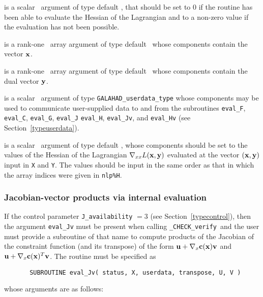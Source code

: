 \documentclass{galahad}
\newcommand{\packagename}{CHECK}
\newcommand{\fullpackagename}{\libraryname\_\packagename}
\newcommand{\solver}{{\tt \fullpackagename\_verify}}
\begin{document}
\begin{description}

 is a scalar \intentout\ argument of type default \integer,
that should be set to 0 if the routine has been able to evaluate
the Hessian of the Lagrangian 
and to a non-zero value if the evaluation has not been possible.

 is a rank-one \intentin\ array argument of type default \realdp\
whose components contain the vector ${\mathbf{x}}$.

 is a rank-one \intentin\ array argument of type default \realdp\
whose components contain the dual vector ${\mathbf{y}}$.

 is a scalar \intentinout\ argument of type 
{\tt GALAHAD\_userdata\_type} whose components may be used
to communicate user-supplied data to and from the
subroutines {\tt eval\_F}, {\tt eval\_C}, {\tt eval\_G}, {\tt eval\_J}
{\tt eval\_H}, {\tt eval\_Jv}, and {\tt eval\_Hv} 
(see Section~\ref{typeuserdata}). 

 is a scalar \intentout\ argument of type default \realdp,
whose components should be set to the values of the Hessian
of the Lagrangian $\nabla_{xx} L({\mathbf{x}},{\mathbf{y}})$
evaluated at the vector $({\mathbf{x}},{\mathbf{y}})$ input in {\tt X} and {\tt Y}. The values should
be input in the same order as that in which the array indices were
given in {\tt nlp\%H}.

\end{description}


\subsubsection{Jacobian-vector products via internal evaluation\label{jvfv}}

If the control parameter {\tt J\_availability} $=3$ (see
Section~\ref{typecontrol}), then the argument {\tt eval\_Jv} must be
present when calling \solver\ and the
user must provide a subroutine of that name to compute
products of the Jacobian of the constraint function (and its transpose)
of the form ${\mathbf{u}} + \nabla_{x} {\mathbf{c}}({\mathbf{x}}){\mathbf{v}}$ and
${\mathbf{u}} + \nabla_{x} {\mathbf{c}}({\mathbf{x}})^T{\mathbf{v}}$.
The routine must be specified as

\def\baselinestretch{0.8}
{\tt \begin{verbatim}
       SUBROUTINE eval_Jv( status, X, userdata, transpose, U, V ) \end{verbatim} }
\def\baselinestretch{1.0}
\noindent whose arguments are as follows:
\end{document}
